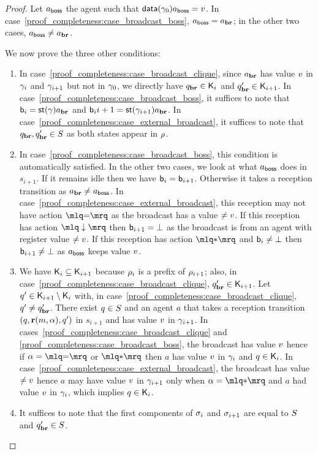 \begin{proof}
Let $a_{\mathsf{boss}}$ the agent such that $\mathsf{data}(\gamma_0){a_{\mathsf{boss}}} = v$. In case~\ref{proof_completeness:case_broadcast_boss}, $a_{\mathsf{boss}} = a_{\textbf{br}}$; in the other two cases, $a_{\mathsf{boss}} \ne a_{\textbf{br}}$. 

We now prove the three other conditions:
\begin{enumerate}[label = (\roman*)]
\item In case~\ref{proof_completeness:case_broadcast_clique}, since $a_{\textbf{br}}$ has value $v$ in $\gamma_i$ and $\gamma_{i+1}$ but not in $\gamma_0$, we directly have $q_{\textbf{br}} \in \mathsf{K}_i$ and $q_{\textbf{br}}' \in \mathsf{K}_{i+1}$. In case~\ref{proof_completeness:case_broadcast_boss}, it suffices to note that $\mathsf{b}_i = \mathsf{st}(\gamma){a_{\textbf{br}}}$ and $\mathsf{b}_i{i+1} = \mathsf{st}(\gamma_{i+1}){a_{\textbf{br}}}$. In case~\ref{proof_completeness:case_external_broadcast}, it suffices to note that $q_{\textbf{br}}, q_{\textbf{br}}' \in S$ as both states appear in $\rho$.
\item In case~\ref{proof_completeness:case_broadcast_boss}, this condition is automatically satisfied. In the other two cases, we look at what $a_{\mathsf{boss}}$ does in $s_{i+1}$. If it remains idle then we have $\mathsf{b}_i = \mathsf{b}_{i+1}$. Otherwise it takes a reception transition as $a_{\textbf{br}} \ne a_{\mathsf{boss}}$. 
In case~\ref{proof_completeness:case_external_broadcast}, this reception may not have action $\quotemarks{\eqtestact}$ as the broadcast has a value $\ne v$. If this reception has action $\quotemarks{\enregact}$ then $\mathsf{b}_{i+1}= \bot$ as the broadcast is from an agent with register value $\ne v$. If this reception has action $\quotemarks{\dummyact}$ and $\mathsf{b}_i \ne \bot$ then $\mathsf{b}_{i+1} \ne \bot$ as $a_{\mathsf{boss}}$ keeps value $v$.
\item We have $\mathsf{K}_i \subseteq \mathsf{K}_{i+1}$ because $\rho_{i}$ is a prefix of $\rho_{i+1}$; also, in case~\ref{proof_completeness:case_broadcast_clique}, $q_{\textbf{br}}' \in \mathsf{K}_{i+1}$. Let $q' \in \mathsf{K}_{i+1} \setminus \mathsf{K}_i$ with, in case~\ref{proof_completeness:case_broadcast_clique}, $q' \ne q_{\textbf{br}}'$. There exist $q\in S$ and an agent $a$ that takes a reception transition $(q, \textbf{r}(m, \alpha), q')$ in $s_{i+1}$ and has value $v$ in $\gamma_{i+1}$. In cases~\ref{proof_completeness:case_broadcast_clique} and \ref{proof_completeness:case_broadcast_boss}, the broadcast has value $v$ hence if $\anact = \quotemarks{\eqtestact}$ or $\quotemarks{\dummyact}$ then $a$ has value $v$ in $\gamma_i$ and $q \in \mathsf{K}_i$. In case~\ref{proof_completeness:case_external_broadcast}, the broadcast has value $\ne v$ hence $a$ may have value $v$ in $\gamma_{i+1}$ only when $\anact = \quotemarks{\dummyact}$ and $a$ had value $v$ in $\gamma_i$, which implies $q \in \mathsf{K}_i$. 
\item It suffices to note that the first components of $\sigma_i$ and $\sigma_{i+1}$ are equal to $S$ and $q_{\textbf{br}}' \in S$. 
\end{enumerate}


\end{proof}
